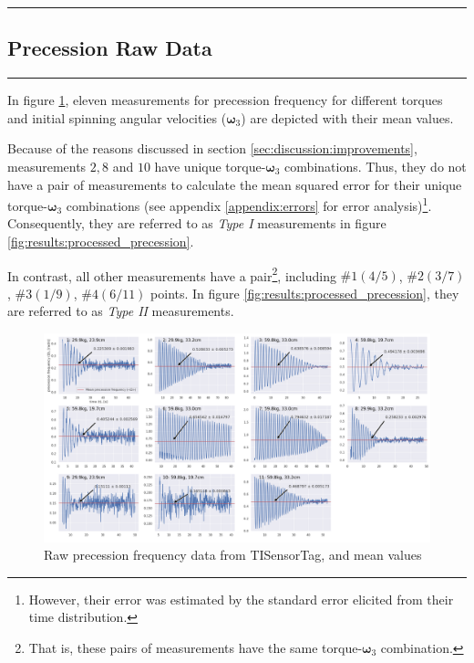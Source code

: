 {\color{gray}\hrule}
\begin{center}
\section{Precession Raw Data} \label{sec:appendix:precession_raw_data}
\end{center}
{\color{gray}\hrule}

\begin{multicols}{2}
In figure \ref{fig:appendix:raw_precession_data}, eleven measurements for precession frequency for different torques and initial spinning angular velocities ($\boldsymbol\omega_{3}$) are depicted with their mean values.

Because of the reasons discussed in section \ref{sec:discussion:improvements}, measurements $2, 8$ and $10$ have unique torque-$\boldsymbol\omega_3$ combinations. Thus, they do not have a pair of measurements to calculate the mean squared error for their unique torque-$\boldsymbol\omega_3$ combinations (see appendix \ref{appendix:errors} for error analysis)\footnote{However, their error was estimated by the standard error elicited from their time distribution.}. Consequently, they are referred to as \emph{Type I} measurements in figure \ref{fig:results:processed_precession}.

In contrast, all other measurements have a pair\footnote{That is, these pairs of measurements have the same torque-$\boldsymbol\omega_3$ combination.}, including $\#1 (4/5)$, $\#2 (3/7)$, $\#3 (1/9)$, $\#4 (6/11)$ points. In figure \ref{fig:results:processed_precession}, they are referred to as \emph{Type II} measurements.

\end{multicols}
\begin{figure}[!ht]
  \centering
  \includegraphics[width=\textwidth]{gyroscope/images/raw_precession}
  \caption{Raw precession frequency data from TISensorTag, and mean values}
  \label{fig:appendix:raw_precession_data}
\end{figure}

